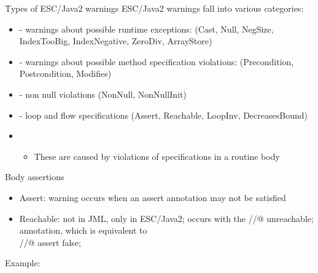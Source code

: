 \documentclass[
pdf,
nocolorBG,
slideColor,
cok,
]{prosper}
\begin{document}
\begin{slide}{Types of ESC/Java2 warnings}
\vspace*{-6ex}
ESC/Java2 warnings fall into various categories:
\begin{itemize}
\item[] - {\gray warnings about possible { runtime exceptions}:
(Cast, Null, NegSize, IndexTooBig, IndexNegative, ZeroDiv, ArrayStore)}

\item[] - {\gray warnings about possible method { specification violations}:
(Precondition, Postcondition, Modifies)}

\item[] - {\gray non null violations (NonNull, NonNullInit)}

\item[] - {\knalblue loop} and {\knalblue flow} specifications (Assert, Reachable, LoopInv, DecreasesBound)

\item[]
\begin{itemize}
\item These are caused by violations of specifications in a routine body
\end{itemize}

\end{itemize}
\end{slide}
\begin{slide}{Body assertions}
\scriptsize
\vspace*{-10ex}
\begin{itemize}
\item {\knalblue Assert}: warning occurs when an {\blue assert} annotation may not be satisfied
\item {\knalblue Reachable}: not in JML, only in ESC/Java2; occurs with the
{\blue //@ unreachable;}
annotation, which is equivalent to\\ {\blue //@ assert false; }
\end{itemize}
\tiny
Example:
\begin{figure*}

\end{figure*}
\end{slide}
\end{document}
